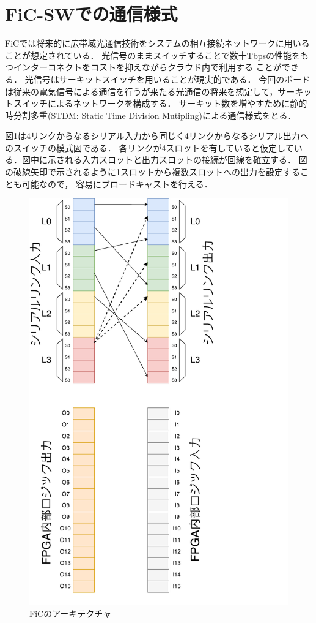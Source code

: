 {  \section{FiC-SWでの通信様式}
  \label{sec:ficsw_communication}
  FiCでは将来的に広帯域光通信技術をシステムの相互接続ネットワークに用いることが想定されている．
  光信号のままスイッチすることで数十Tbpsの性能をもつインターコネクトをコストを抑えながらクラウド内で利用する
  ことができる．
  光信号はサーキットスイッチを用いることが現実的である．
  今回のボードは従来の電気信号による通信を行うが来たる光通信の将来を想定して，サーキットスイッチによるネットワークを構成する．
  サーキット数を増やすために静的時分割多重(STDM: Static Time Division Mutipling)による通信様式をとる．
  
  図\ref{fig:arch-sw}は4リンクからなるシリアル入力から同じく4リンクからなるシリアル出力へのスイッチの模式図である．
  各リンクが4スロットを有していると仮定している．図中に示される入力スロットと出力スロットの接続が回線を確立する．
  図の破線矢印で示されるように1スロットから複数スロットへの出力を設定することも可能なので，
  容易にブロードキャストを行える．
  
   \begin{figure}[h]
     \centering
     \includegraphics[width=12cm]{./chap3/fig/arch_sw.pdf}
     \caption{FiCのアーキテクチャ}
     \label{fig:arch-sw}
   \end{figure}
}
